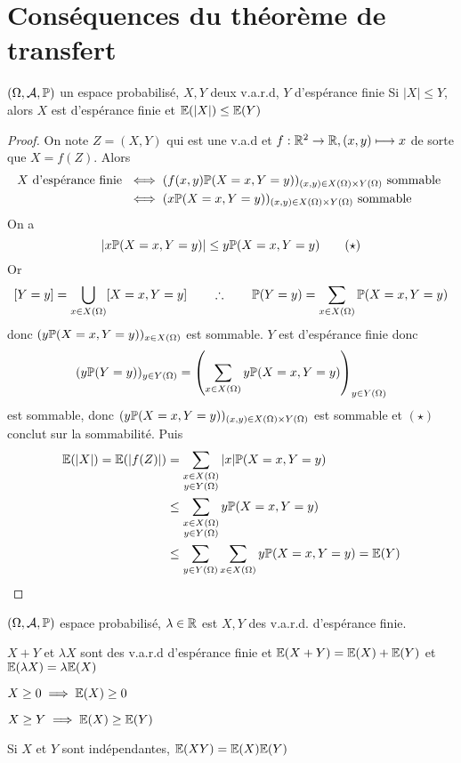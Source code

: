 \section{Conséquences du théorème de transfert}

\begin{prop}
    \Hyp $(\Omega, \mathcal  A, \P)$ un espace probabilisé, $X,Y$ deux v.a.r.d, $Y$ d'espérance finie
    \Conc Si  $|X|\leq Y$, alors  $X$ est d'espérance finie et $\E(|X|)\leq \E(Y)$
\end{prop}

\begin{proof}
    On note $Z=(X,Y)$ qui est une v.a.d et  $f:\R^2\to \R,(x,y)\longmapsto x$ de sorte que $X=f(Z)$. Alors  \begin{align*}
        X\text{ d'espérance finie } &\iff (f(x, y)\P(X=x,Y=y))_{(x,y)\in X(\Omega)\times Y(\Omega)}\text{ sommable } \\ &\iff  (x\P(X=x,Y=y))_{(x,y)\in X(\Omega)\times Y(\Omega)}\text{ sommable }
    \end{align*}
    On a \[
        |x\P(X=x,Y=y)|\leq y\P(X=x,Y=y)\tag{$\star$}
    \] 
    Or \[
        [Y=y]=\bigcup_{x \in  X(\Omega)}[X=x,Y=y] \qquad \therefore \qquad  \P(Y=y)=\sum_{x \in  X(\Omega)}\P(X=x,Y=y)
    \]
    donc $(y\P(X=x,Y=y))_{x \in  X(\Omega)}$ est sommable. $Y$ est d'espérance finie donc  \[
        (y\P(Y=y))_{y\in Y(\Omega)}=\left( \sum_{x\in X(\Omega)}y\P(X=x,Y=y) \right) _{y \in  Y(\Omega)}
    \] 
    est sommable, donc $(y\P(X=x,Y=y))_{(x,y)\in  X(\Omega)\times Y(\Omega)}$ est sommable et $(\star)$ conclut sur la sommabilité. Puis  \begin{align*}
        \E(|X|)=\E(|f(Z)|)&=\sum_{\substack{x \in  X(\Omega)\\y\in Y(\Omega)}}|x|\P(X=x,Y=y)\\&\leq \sum_{\substack{x \in  X(\Omega)\\y\in Y(\Omega)}}y\P(X=x,Y=y)\\&\leq \sum_{y\in Y(\Omega)}\sum_{x\in X(\Omega)}y\P(X=x,Y=y)=\E(Y)
    \end{align*}
\end{proof}

\begin{thm}
    \Hyp $(\Omega, \mathcal A, \P)$ espace probabilisé, $\lambda\in \R$ est $X,Y$ des v.a.r.d. d'espérance finie.
     \begin{concenum}
     \item $X+Y$ et $\lambda X$ sont des v.a.r.d d'espérance finie et  $\E(X+Y)=\E(X)+\E(Y)$ et $ \E(\lambda X)=\lambda \E(X)$
     \item $X\geq 0 \implies \E(X)\geq 0$
     \item $X\geq Y\implies\E(X)\geq \E(Y)$
     \item Si $X$ et $Y$ sont indépendantes, $\E(XY)=\E(X)\E(Y)$
    \end{concenum}
\end{thm}

